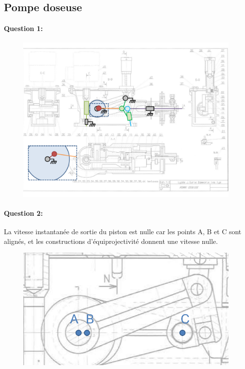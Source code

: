 \newpage

\subsection{Pompe doseuse}

\paragraph{Question 1:}

\begin{figure}[!h]
\centering\includegraphics[width=0.8\linewidth]{img/pompe_cin.pdf}
\end{figure}

\paragraph{Question 2:}

La vitesse instantanée de sortie du piston est nulle car les points A, B et C sont alignés, et les constructions d'équiprojectivité donnent une vitesse nulle.

\begin{figure}[!h]
\centering\includegraphics[width=0.8\linewidth]{img/pompe2}
\end{figure}


~\

